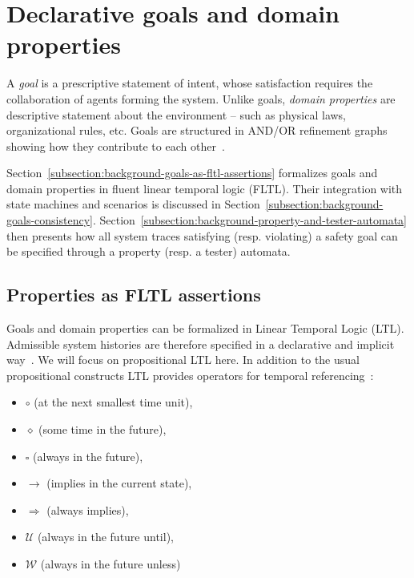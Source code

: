 \section{Declarative goals and domain properties\label{section:background-goals}}

A \emph{goal} is a prescriptive statement of intent, whose satisfaction requires the collaboration of agents forming the system. Unlike goals, \emph{domain properties} are descriptive statement about the environment -- such as physical laws, organizational rules, etc. Goals are structured in AND/OR refinement graphs showing how they contribute to each other~\cite{VanLamsweerde:2000}.

Section~\ref{subsection:background-goals-as-fltl-assertions} formalizes goals and domain properties in fluent linear temporal logic (FLTL). Their integration with state machines and scenarios is discussed in Section~\ref{subsection:background-goals-consistency}. Section~\ref{subsection:background-property-and-tester-automata} then presents how all system traces satisfying (resp. violating) a safety goal can be specified through a property (resp. a tester) automata.

\subsection{Properties as FLTL assertions\label{subsection:background-goals-as-fltl-assertions}}

Goals and domain properties can be formalized in Linear Temporal Logic (LTL). Admissible system histories are therefore specified in a declarative and implicit way~\cite{VanLamsweerde:2009}. We will focus on propositional LTL here. In addition to the usual propositional constructs LTL provides operators for temporal referencing~\cite{Manna:1992}: 

\begin{itemize}
\item $\circ$ (at the next smallest time unit), 
\item $\diamond$ (some time in the future), 
\item $\square$ (always in the future), 
\item $\rightarrow$ (implies in the current state), 
\item $\Rightarrow$ (always implies), 
\item $\mathcal{U}$ (always in the future until), 
\item $\mathcal{W}$ (always in the future unless)
\end{itemize}

